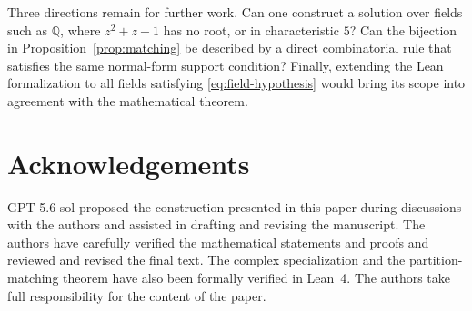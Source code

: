 \documentclass[11pt,reqno]{amsart}
\theoremstyle{definition}
\theoremstyle{remark}
\theoremstyle{plain}
\begin{document}
Three directions remain for further work.  Can one construct a solution over fields
such as \(\mathbb Q\), where \(z^2+z-1\) has no root, or in
characteristic \(5\)?  Can the bijection in
Proposition~\ref{prop:matching} be described by a direct combinatorial
rule that satisfies the same normal-form support condition?
Finally, extending the Lean formalization to all fields satisfying
\eqref{eq:field-hypothesis} would bring its scope into agreement with
the mathematical theorem.

\section*{Acknowledgements}
GPT-5.6 sol proposed the construction presented in this paper during
discussions with the authors and assisted in drafting and revising
the manuscript. The authors have carefully verified the mathematical
statements and proofs and reviewed and revised the final text.
The complex specialization and the partition-matching theorem have
also been formally verified in Lean~4. The authors take full
responsibility for the content of the paper.


\end{document}
